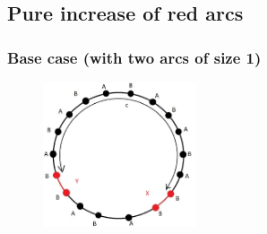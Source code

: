 \documentclass[]{book}
\theoremstyle{definition}
\begin{document}
\subsection{Pure increase of red arcs}
\subsubsection{Base case (with two arcs of size 1)}
\begin{figure}[H]
    \centering
    \includegraphics[width=0.4\textwidth]{figures/sync_pure_increase_3.jpg}
    \caption{}
\end{figure}
\end{document}
